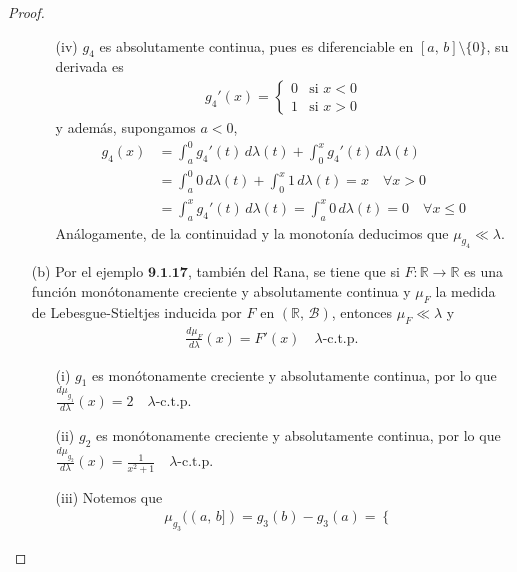 \documentclass[12pt]{article}
\begin{document}
\begin{proof}
\begin{itemize}
\begin{itemize}
                  \item[(iv)] $g_4$ es absolutamente continua, pues es diferenciable en $[a \text{, }b] \setminus \{0\}$, su derivada es \begin{align*}
                            g_4'(x) = \begin{cases}
                                          0 & \text{si } x < 0 \\
                                          1 & \text{si } x > 0
                                      \end{cases}
                        \end{align*} y además, supongamos $a < 0$, \begin{align*}
                            g_4(x) & = \int_a^0 g_4'(t) \, d\lambda(t) + \int_0^x g_4'(t) \, d\lambda(t)                      \\
                                   & = \int_a^0 0 \, d\lambda(t) + \int_0^x 1 \, d\lambda(t) = x \quad \forall x > 0          \\
                                   & = \int_a^x g_4'(t) \, d\lambda(t) = \int_a^x 0 \, d\lambda(t) = 0 \quad \forall x \leq 0
                        \end{align*}
                        Análogamente, de la continuidad y la monotonía deducimos que $\mu_{g_4} \ll \lambda$.
              \end{itemize}
        \item[(b)] Por el ejemplo $\textbf{9.1.17}$, también del Rana, se tiene que si $F: \mathbb{R} \to \mathbb{R}$ es una función monótonamente creciente y absolutamente continua y $\mu_F$ la medida de Lebesgue-Stieltjes inducida por $F$ en $(\mathbb{R}\text{, } \mathcal{B})$,
              entonces $\mu_F \ll \lambda$ y \begin{align*}
                  \frac{d\mu_F}{d\lambda}(x) = F'(x) \quad \lambda\text{-c.t.p.}
              \end{align*}
              \begin{itemize}
                  \item[(i)] $g_1$ es monótonamente creciente y absolutamente continua, por lo que $\frac{d\mu_{g_1}}{d\lambda}(x) = 2 \quad \lambda\text{-c.t.p.}$
                  \item[(ii)] $g_2$ es monótonamente creciente y absolutamente continua, por lo que $\frac{d\mu_{g_2}}{d\lambda}(x) = \frac{1}{x^2 + 1} \quad \lambda\text{-c.t.p.}$
                  \item[(iii)] Notemos que \begin{align*}\mu_{g_3}((a\text{, }b]) = g_3(b) - g_3(a) = \begin{cases}

\end{cases}
\end{align*}
\end{itemize}
\end{itemize}
\end{proof}
\end{document}
